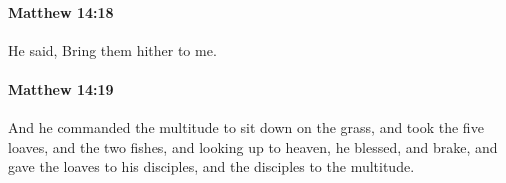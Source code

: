 		\paragraph{Matthew 14:18} %
			\label{MATTHEW-14-18}

			He said, Bring them hither to me.

			\begin{framed}
			\scriptsize
				\begin{compactdesc}
					\item[SBLG] 
				\end{compactdesc}
			\end{framed}

		\paragraph{Matthew 14:19} %
			\label{MATTHEW-14-19}

			And he commanded the multitude to sit down on the grass, and took the five loaves, and the two fishes, and looking up to heaven, he blessed, and brake, and gave the loaves to his disciples, and the disciples to the multitude.

